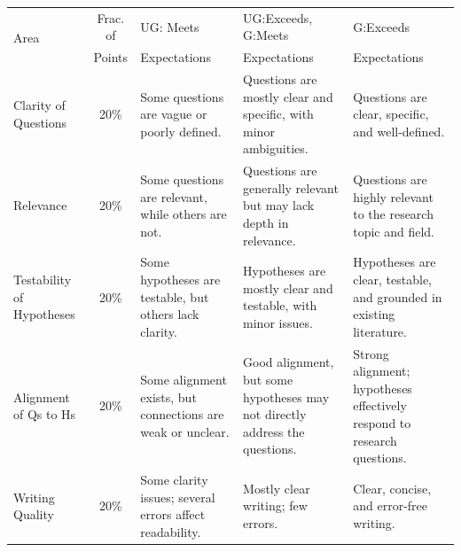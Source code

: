 \documentclass[11pt]{article}
\begin{document}
\begin{landscape}
\begin{table}
    \centering
    \small
    \begin{tabular}{p{.75in} c  p{2.25in}  p{2.25in}  p{2.25in}}
        \multirow{2}{*}{Area}  	& Frac. of   	& UG: Meets		& UG:Exceeds, G:Meets   & G:Exceeds 	  \\
                                & Points & Expectations  & Expectations  		& Expectations \\
        \toprule
        Clarity of Questions	& 20\%\vspace{.25in} 				& Some questions are vague or poorly defined. & Questions are mostly clear and specific, with minor ambiguities. & Questions are clear, specific, and well-defined. \\
        \midrule
        Relevance               & 20\%\vspace{.25in}				& Some questions are relevant, while others are not. & Questions are generally relevant but may lack depth in relevance. & Questions are highly relevant to the research topic and field. \\
        \midrule
        Testability of Hypotheses & 20\%\vspace{.25in}			& Some hypotheses are testable, but others lack clarity. & Hypotheses are mostly clear and testable, with minor issues. & Hypotheses are clear, testable, and grounded in existing literature. \\
        \midrule
        Alignment of Qs to Hs   & 20\%\vspace{.25in}				& Some alignment exists, but connections are weak or unclear. & Good alignment, but some hypotheses may not directly address the questions. & Strong alignment; hypotheses effectively respond to research questions. \\
        \midrule
        Writing Quality 		& 20\%\vspace{.25in}				& Some clarity issues; several errors affect readability. & Mostly clear writing; few errors. & Clear, concise, and error-free writing. \\
        \bottomrule
    \end{tabular}
\end{table}
\end{landscape}

\end{document}
